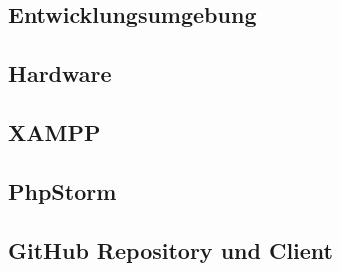 \documentclass[12pt,a4paper,titlepage]{article} %
\begin{document}


\clearpage
\newpage
\begin{appendix}


\section{Entwicklungsumgebung}
\subsection{Hardware}
\subsection{XAMPP}
\subsection{PhpStorm}
\subsection{GitHub Repository und Client}
\end{appendix}
\end{document}
